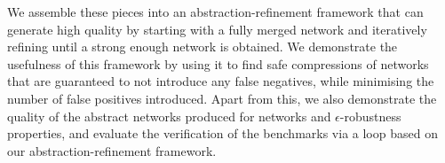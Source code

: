 We assemble these pieces into an abstraction-refinement framework that can
generate high quality \abs by starting with a fully merged network and
iteratively refining until a strong enough network is obtained. We demonstrate
the usefulness of this framework by using it to find safe compressions of
\mnist networks that are guaranteed to not introduce any false negatives, while
minimising the number of false positives introduced. Apart from this, we also
demonstrate the quality of the abstract networks produced for \mnist networks
and $\epsilon$-robustness properties, and evaluate the verification of the
\acasxu benchmarks via a \cegar loop based on our abstraction-refinement
framework.


